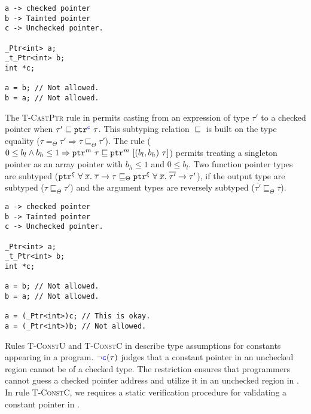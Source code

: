 
\begin{verbatim}
a -> checked pointer
b -> Tainted pointer
c -> Unchecked pointer.

_Ptr<int> a;
_t_Ptr<int> b;
int *c;

a = b; // Not allowed.
b = a; // Not allowed.
\end{verbatim}


The \textsc{T-CastPtr} rule in 
permits casting from an expression of type $\tau'$ to a checked pointer when
$\tau' \sqsubseteq \tptr{\tau}{\cmode}$. This subtyping relation
$\sqsubseteq$ is built on the type equality ($\tau =_{\Theta} \tau'\Rightarrow\tau \sqsubseteq_{\Theta} \tau'$). 
The rule  ($0\le b_l \wedge b_h \le 1 \Rightarrow \tptr{\tau}{m}\sqsubseteq
\tarrayptr{b_l}{b_h}{\tau}{m}$) permits treating a singleton
pointer as an array pointer with $b_h\le 1$ and $0 \le b_l$.
Two function pointer types are subtyped ($\tptr{\tfun{\overline{x}}{\overline{\tau}}{\tau}}{\xi} \sqsubseteq_{\Theta} \tptr{\tfun{\overline{x}}{\overline{\tau'}}{\tau'}}{\xi}$), 
if the output type are subtyped ($\tau\sqsubseteq_{\Theta}\tau'$) and the argument types are reversely subtyped ($\overline{\tau'}\sqsubseteq_{\Theta}\overline{\tau}$).


\begin{verbatim}
a -> checked pointer
b -> Tainted pointer
c -> Unchecked pointer.

_Ptr<int> a;
_t_Ptr<int> b;
int *c;

a = b; // Not allowed.
b = a; // Not allowed.

a = (_Ptr<int>)c; // This is okay.
a = (_Ptr<int>)b; // Not allowed.
\end{verbatim}

Rules \textsc{T-ConstU} and \textsc{T-ConstC} in 
describe type assumptions for constants appearing in a program.
$\neg \cmode(\tau)$ judges that a constant pointer 
in an unchecked region cannot be of a checked type.
The restriction ensures that programmers 
cannot guess a checked pointer address and utilize it in an unchecked region in \systemname.
In rule \textsc{T-ConstC}, we requires a static 
verification procedure for validating a constant pointer in . 

